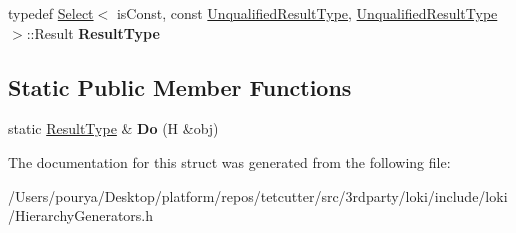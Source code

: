 \begin{DoxyCompactItemize}
\item 
\hypertarget{structLoki_1_1FieldHelper_3_01H_00_010_01_4_a1e6198be226e706eb1416c706d6a7185}{}typedef \hyperlink{structLoki_1_1Select}{Select}$<$ is\+Const, const \hyperlink{structP1}{Unqualified\+Result\+Type}, \hyperlink{structP1}{Unqualified\+Result\+Type} $>$\+::Result {\bfseries Result\+Type}\label{structLoki_1_1FieldHelper_3_01H_00_010_01_4_a1e6198be226e706eb1416c706d6a7185}

\end{DoxyCompactItemize}
\subsection*{Static Public Member Functions}
\begin{DoxyCompactItemize}
\item 
\hypertarget{structLoki_1_1FieldHelper_3_01H_00_010_01_4_abd926b7b9cea3fb3bc30a26016ffea1f}{}static \hyperlink{structP1}{Result\+Type} \& {\bfseries Do} (H \&obj)\label{structLoki_1_1FieldHelper_3_01H_00_010_01_4_abd926b7b9cea3fb3bc30a26016ffea1f}

\end{DoxyCompactItemize}


The documentation for this struct was generated from the following file\+:\begin{DoxyCompactItemize}
\item 
/\+Users/pourya/\+Desktop/platform/repos/tetcutter/src/3rdparty/loki/include/loki/Hierarchy\+Generators.\+h\end{DoxyCompactItemize}
